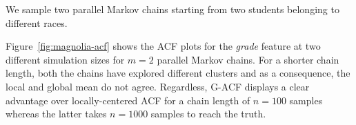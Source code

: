 \documentclass[12pt]{article}
\theoremstyle{remark}
\begin{document}







We sample two parallel Markov chains starting from two students belonging to different races.

% 
Figure~\ref{fig:magnolia-acf} shows the ACF plots for the \textit{grade} feature at two different simulation sizes for $m=2$ parallel Markov chains. For a shorter chain length, both the chains have explored different clusters and as a consequence, the local and global mean do not agree. Regardless, G-ACF displays a clear advantage over locally-centered ACF for a chain length of $n=100$ samples whereas the latter takes $n=1000$ samples to reach the truth. 




\end{document}
